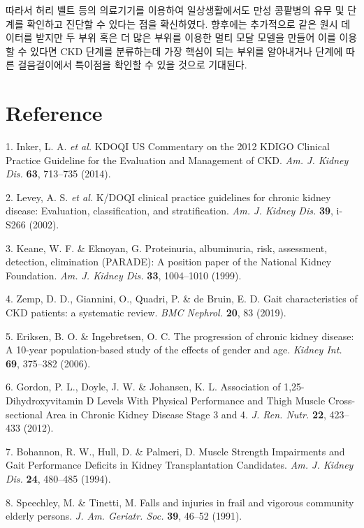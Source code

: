 \documentclass{article}
\begin{document}
따라서 허리 벨트 등의 의료기기를 이용하여 일상생활에서도 만성 콩팥병의
유무 및 단계를 확인하고 진단할 수 있다는 점을 확신하였다. 향후에는
추가적으로 같은 원시 데이터를 받지만 두 부위 혹은 더 많은 부위를 이용한
멀티 모달 모델을 만들어 이를 이용할 수 있다면 CKD 단계를 분류하는데 가장
핵심이 되는 부위를 알아내거나 단계에 따른 걸음걸이에서 특이점을 확인할
수 있을 것으로 기대된다.



\section{Reference}

1. Inker, L. A. \emph{et al.} KDOQI US Commentary on the 2012 KDIGO
Clinical Practice Guideline for the Evaluation and Management of CKD.
\emph{Am. J. Kidney Dis.} \textbf{63}, 713--735 (2014).

2. Levey, A. S. \emph{et al.} K/DOQI clinical practice guidelines for
chronic kidney disease: Evaluation, classification, and stratification.
\emph{Am. J. Kidney Dis.} \textbf{39}, i-S266 (2002).

3. Keane, W. F. \& Eknoyan, G. Proteinuria, albuminuria, risk,
assessment, detection, elimination (PARADE): A position paper of the
National Kidney Foundation. \emph{Am. J. Kidney Dis.} \textbf{33},
1004--1010 (1999).

4. Zemp, D. D., Giannini, O., Quadri, P. \& de Bruin, E. D. Gait
characteristics of CKD patients: a systematic review. \emph{BMC
Nephrol.} \textbf{20}, 83 (2019).

5. Eriksen, B. O. \& Ingebretsen, O. C. The progression of chronic
kidney disease: A 10-year population-based study of the effects of
gender and age. \emph{Kidney Int.} \textbf{69}, 375--382 (2006).

6. Gordon, P. L., Doyle, J. W. \& Johansen, K. L. Association of
1,25-Dihydroxyvitamin D Levels With Physical Performance and Thigh
Muscle Cross-sectional Area in Chronic Kidney Disease Stage 3 and 4.
\emph{J. Ren. Nutr.} \textbf{22}, 423--433 (2012).

7. Bohannon, R. W., Hull, D. \& Palmeri, D. Muscle Strength Impairments
and Gait Performance Deficits in Kidney Transplantation Candidates.
\emph{Am. J. Kidney Dis.} \textbf{24}, 480--485 (1994).

8. Speechley, M. \& Tinetti, M. Falls and injuries in frail and vigorous
community elderly persons. \emph{J. Am. Geriatr. Soc.} \textbf{39},
46--52 (1991).
\end{document}
